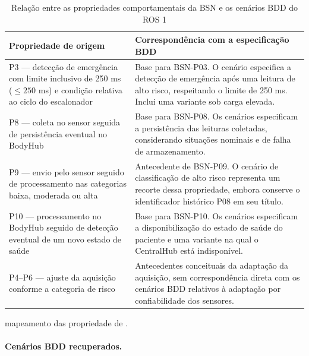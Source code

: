 \begin{table}[htbp]
\centering
\caption{Relação entre as propriedades comportamentais da BSN e os cenários BDD do ROS 1}
\label{tab:features-definicoes}

\begin{tabularx}{\textwidth}{@{}
  >{\raggedright\arraybackslash}X
  >{\raggedright\arraybackslash}X@{}}
\toprule
\textbf{Propriedade de origem} &
\textbf{Correspondência com a especificação BDD} \\
\midrule

P3 --- detecção de emergência com limite inclusivo de
250 ms ($\leq 250$ ms) e condição relativa ao ciclo do escalonador &
Base para BSN-P03. O cenário especifica a detecção de emergência
após uma leitura de alto risco, respeitando o limite de 250 ms.
Inclui uma variante sob carga elevada. \\

P8 --- coleta no sensor seguida de persistência eventual no BodyHub &
Base para BSN-P08. Os cenários especificam a persistência
das leituras coletadas, considerando situações nominais
e de falha de armazenamento. \\

P9 --- envio pelo sensor seguido de processamento nas categorias
baixa, moderada ou alta &
Antecedente de BSN-P09. O cenário de classificação de alto
risco representa um recorte dessa propriedade, embora
conserve o identificador histórico P08 em seu título. \\

P10 --- processamento no BodyHub seguido de detecção eventual
de um novo estado de saúde &
Base para BSN-P10. Os cenários especificam a disponibilização
do estado de saúde do paciente e uma variante na qual
o CentralHub está indisponível. \\

P4--P6 --- ajuste da aquisição conforme a categoria de risco &
Antecedentes conceituais da adaptação da aquisição, sem
correspondência direta com os cenários BDD relativos
à adaptação por confiabilidade dos sensores. \\

\bottomrule
\end{tabularx}

\par\smallskip
{\footnotesize
mapeamento das propriedade de \cite{Rodrigues_2018}.
}

\end{table}

\paragraph{Cenários BDD recuperados.}

